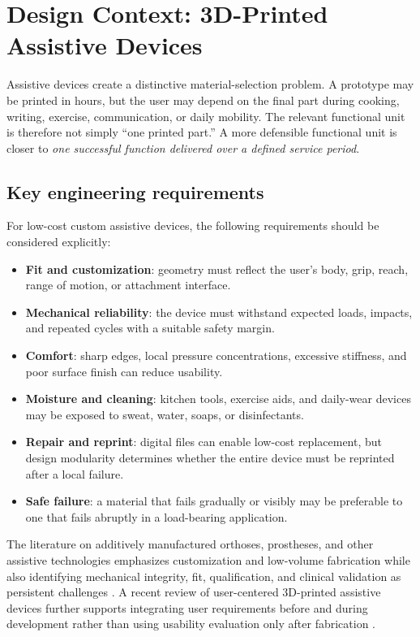 \documentclass[11pt]{article}
\begin{document}
\section{Design Context: 3D-Printed Assistive Devices}

Assistive devices create a distinctive material-selection problem. A prototype may be printed in hours, but the user may depend on the final part during cooking, writing, exercise, communication, or daily mobility. The relevant functional unit is therefore not simply ``one printed part.'' A more defensible functional unit is closer to \emph{one successful function delivered over a defined service period}.

\subsection{Key engineering requirements}

For low-cost custom assistive devices, the following requirements should be considered explicitly:

\begin{itemize}
  \item \textbf{Fit and customization}: geometry must reflect the user's body, grip, reach, range of motion, or attachment interface.
  \item \textbf{Mechanical reliability}: the device must withstand expected loads, impacts, and repeated cycles with a suitable safety margin.
  \item \textbf{Comfort}: sharp edges, local pressure concentrations, excessive stiffness, and poor surface finish can reduce usability.
  \item \textbf{Moisture and cleaning}: kitchen tools, exercise aids, and daily-wear devices may be exposed to sweat, water, soaps, or disinfectants.
  \item \textbf{Repair and reprint}: digital files can enable low-cost replacement, but design modularity determines whether the entire device must be reprinted after a local failure.
  \item \textbf{Safe failure}: a material that fails gradually or visibly may be preferable to one that fails abruptly in a load-bearing application.
\end{itemize}

The literature on additively manufactured orthoses, prostheses, and other assistive technologies emphasizes customization and low-volume fabrication while also identifying mechanical integrity, fit, qualification, and clinical validation as persistent challenges \cite{chen2016,tenkate2017,sakib2023,rasmussen2026}. A recent review of user-centered 3D-printed assistive devices further supports integrating user requirements before and during development rather than using usability evaluation only after fabrication \cite{coelho2026}.
\end{document}
